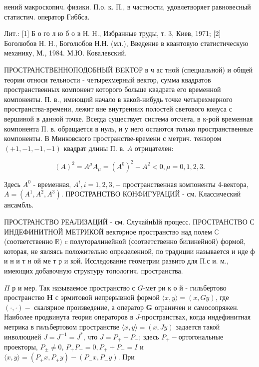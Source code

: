 \documentclass[10pt]{article}
\begin{document}
нений макроскопич. физики. П.о. к. П., в частности, удовлетворяет равновесный статистич. оператор Гиббса.



Лит.: [1] Б о го л ю б о в Н. Н., Избранные труды, т. 3, Киев, 1971; [2] Боголюбов Н. Н., Боголюбов Н.Н. (мл.), Введение в квантовую статистическую механику, М., 1984. М.Ю. Ковалевский.



ПРОСТРАНСТВЕННОПОДОБНЫЙ BEКТОР в ч ас тной (специальной) и общей теории относи тельности - четырехмерный вектор, сумма квадратов пространственных компонент которого больше квадрата его временной компоненты. П. в., имеющий начало в какой-нибудь точке четырехмерного пространства-времени, лежит вне внутренних полостей светового конуса с вершиной в данной точке. Всегда существует система отсчета, в к-рой временная компонента П. в. обращается в нуль, и у него остаются только пространственные компоненты. В Минковского пространстве-времени с метрич. тензором $(+1,-1,-1,-1)$ квадрат длины П. в. $A$ отрицателен:



\[

(A)^{2}=A^{\mu} A_{\mu}=\left(A^{0}\right)^{2}-A^{2}<0, \mu=0,1,2,3 .

\]



Здесь $A^{0}$ - временная, $A^{i}, i=1,2,3,-$ пространственная компоненты 4-вектора, $A=\left(A^{1}, A^{2}, A^{3}\right)$. ПРОСТРАНСТВО КОНФИГУРАЦИЙ - см. Классический ансамбль.



ПРОСТРАНСТВО РЕАЛИЗАЦИЙ - см. СлучайнЫй процесс. ПРОСТРАНСТВО С ИНДЕФИНИТНОЙ МЕТРИКОЙ векторное пространство над полем $\mathbb{C}$ (соответственно $\mathbb{R})$ c полуторалинейной (соответственно билинейной) формой, которая, не являясь положительно определенной, по традиции называется и нде ф и н и т н ой ме т р и кой. Исследование геометрии развито для П.с и. м., имеющих добавочную структуру топологич. пространства.



$\Pi$ р и мер. Так называемое пространство с $G$-мет ри к о й - гильбертово пространство $\boldsymbol{H}$ с эрмитовой непрерывной формой $\langle x, y\rangle=(x, G y)$, где $(\cdot, \cdot)-$ скалярное произведение, а оператор $\boldsymbol{G}$ ограничен и самосопряжен. Наиболее продвинута теория операторов в $J$-пространствах, когда индефинитная метрика в гильбертовом пространстве $\langle x, y\rangle=(x, J y)$ задается такой инволюцией $J=J^{-1}=J^{*}$, что $J=P_{+}-P_{-}$; здесь $P_{+}-$ортогональные проекторы, $P_{ \pm} \neq 0$, $P_{+} P_{-}=0, P_{+}+P_{-}=I$ и $\langle x, y\rangle=\left(P_{+} x, P_{+} y\right)-\left(P_{-} x, P_{-} y\right)$. При
\end{document}
